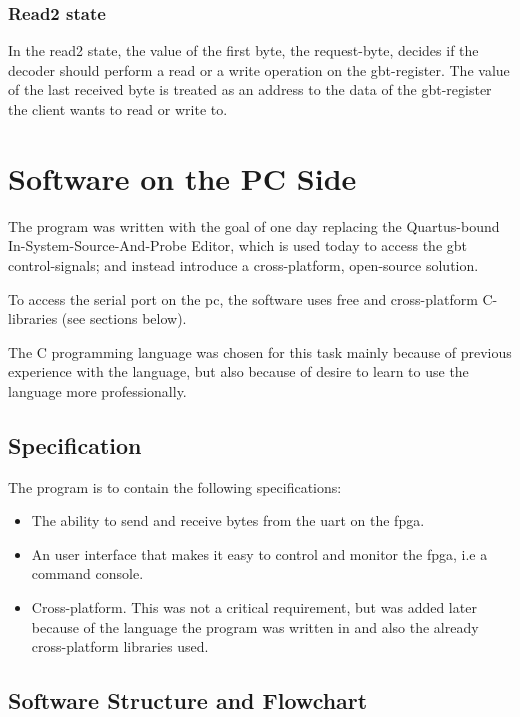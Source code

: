 \documentclass[main.tex]{subfiles}
\begin{document}
\subsubsection{Read2 state}
  In the read2 state, the value of the first byte, the request-byte, decides if the decoder should perform a read or a write operation on the gbt-register. The value of the last received byte is treated as an address to the data of the gbt-register the client wants to read or write to.  


\section{Software on the PC Side} \label{chap:software}

The program was written with the goal of one day replacing the Quartus-bound In-System-Source-And-Probe Editor, which is used today to access the \gls{gbt} control-signals; and instead introduce a cross-platform, open-source solution.

To access the serial port on the \acrshort{pc}, the software uses free and cross-platform C-libraries (see sections below).

The C programming language was chosen for this task mainly because of previous experience with the language, but also because of desire to learn to use the language more professionally. 

\subsection{Specification}

The program is to contain the following specifications:\\
\begin{itemize} \setlength{\itemsep}{10pt}
\item The ability to send and receive bytes from the \gls{uart} on the \gls{fpga}. 
\item An user interface that makes it easy to control and monitor the \gls{fpga}, i.e a command console.
\item Cross-platform. This was not a critical requirement, but was added later because of the language the program was written in and also the already cross-platform libraries used. 
\end{itemize}

\subsection{Software Structure and Flowchart}
\end{document}
